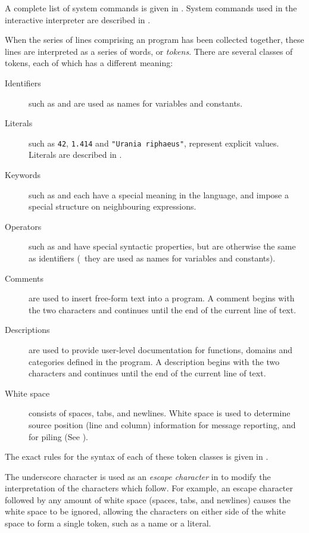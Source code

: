 A complete list of system commands is given in .
System commands used in the interactive interpreter are described in
.

When the series of lines comprising an \asharp{} program has been
collected together, these lines are interpreted as a series of words,
or {\em tokens}.
There are several classes of tokens, each of which has a different meaning:
\begin{description}
\item[Identifiers] such as  and 
are used as names for variables and constants.
\item[Literals] such as \verb"42", \verb"1.414" and \verb+"Urania riphaeus"+,
represent explicit values.  Literals are described in
.
\item[Keywords] such as  and \ttin{==} each have a special meaning
in the language, and impose a special structure on neighbouring expressions.
\item[Operators] such as  and \ttin{+} have special
syntactic properties, but are otherwise the same as identifiers 
(\ie{}~they are used as names for variables and constants).
\item[Comments] are used to insert free-form text into a program.
A comment begins with the two characters \ttin{--} and continues until
the end of the current line of text.
\item[Descriptions] are used to provide user-level documentation for
functions, domains and categories defined in the program.
A description begins with the two characters \ttin{++} and continues
until the end of the current line of text.
\item[White space] consists of spaces, tabs, and newlines.  White space is
used to determine source position (line and column) information for message
reporting, and for piling (See ).
\end{description}

The exact rules for the syntax of each of these token classes is given
in .


The underscore character \ttin{\_} is used as an {\em escape character\/}
in \asharp{} to modify the interpretation of the characters which follow.
For example, an escape character followed by any amount of white space
(spaces, tabs, and newlines) causes the white space to be ignored, allowing
the characters on either side of the white space to form a single token,
such as a name or a literal.

